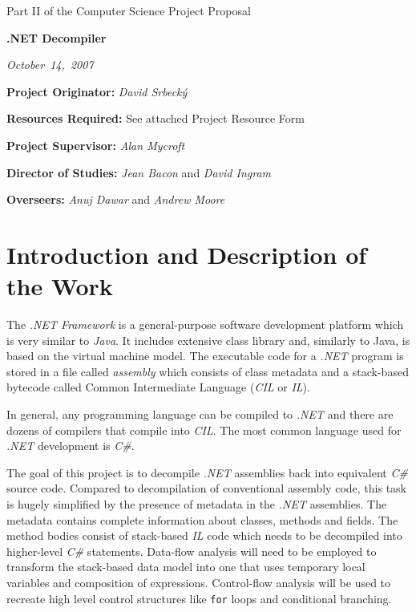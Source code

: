 

\vfil
\vspace{0.4in}
\centerline{\large Part II of the Computer Science Project Proposal}
\vspace{0.4in}
\centerline{\Large\bf .NET Decompiler}
\vspace{0.3in}
\centerline{\large\emph{October~14,~2007}}

\vfil

{\bf Project Originator:} \emph{David Srbeck\'y}

\vspace{0.1in}

{\bf Resources Required:} See attached Project Resource Form

\vspace{0.3in}

{\bf Project Supervisor:} \emph{Alan Mycroft}

\vspace{0.3in}

{\bf Director of Studies:} \emph{Jean Bacon} and \emph{David Ingram}

\vspace{0.3in}

{\bf Overseers:} \emph{Anuj Dawar} and \emph{Andrew Moore}

\vfil
\eject

\section*{Introduction and Description of the Work}
The \emph{.NET Framework} is a general-purpose software development platform 
which is very similar to \emph{Java}.  It includes extensive class library 
and, similarly to Java, is based on the virtual machine model.  The executable 
code for a \emph{.NET} program is stored in a file called \emph{assembly} 
which consists of class metadata and a stack-based bytecode called Common 
Intermediate Language (\emph{CIL} or \emph{IL}).

In general, any programming language can be compiled to \emph{.NET} and 
there are dozens of compilers that compile into \emph{CIL}.  The most 
common language used for \emph{.NET} development is \emph{C\#}.

The goal of this project is to decompile \emph{.NET} assemblies back into 
equivalent \emph{C\#} source code.  Compared to decompilation of 
conventional assembly code, this task is hugely simplified by the 
presence of metadata in the \emph{.NET} assemblies.  The metadata contains 
complete information about classes, methods and fields.  The method bodies 
consist of stack-based \emph{IL} code which needs to be decompiled into 
higher-level \emph{C\#} statements.  Data-flow analysis will need to be 
employed to transform the stack-based data model into one that uses 
temporary local variables and composition of expressions.  Control-flow 
analysis will be used to recreate high level control structures like 
\verb|for| loops and conditional branching.

